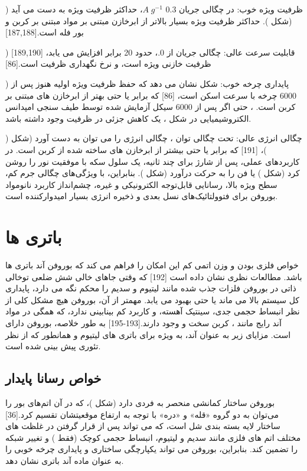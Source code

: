 ) ظرفیت ویژه خوب: در چگالی جریان 0.3 $A\; g^{-1}$، حداکثر ظرفیت ویژه  به دست می آید (شکل ). حداکثر ظرفیت ویژه بسیار بالاتر از ابرخازن مبتنی بر مواد مبتنی بر کربن و بور فله است.[187,188] 

) قابلیت سرعت عالی: چگالی جریان از 0.، حدود 20 برابر افزایش می یابد، [189,190] ظرفیت خازنی ویژه  است، و نرخ نگهداری ظرفیت  است.[86] 

) پایداری چرخه خوب: شکل  نشان می دهد که حفظ ظرفیت ویژه اولیه هنوز  پس از 6000 چرخه با سرعت اسکن  است، [86] که برابر یا حتی بهتر از ابرخازن های مبتنی بر کربن است. ، حتی اگر پس از 6000 سیکل آزمایش شده توسط طیف سنجی امپدانس الکتروشیمیایی در شکل ، یک کاهش جزئی در ظرفیت وجود داشته باشد. 

) چگالی انرژی عالی: تحت چگالی توان ، چگالی انرژی  را می توان به دست آورد (شکل )، [191] که برابر یا حتی بیشتر از ابرخازن های ساخته شده از کربن است. در کاربردهای عملی، پس از شارژ برای چند ثانیه، یک سلول سکه با موفقیت نور را روشن کرد (شکل ) یا فن را به حرکت درآورد (شکل ). بنابراین، با ویژگی‌های چگالی جرم کم، سطح ویژه بالا، رسانایی قابل‌توجه الکترونیکی و غیره، چشم‌انداز کاربرد نانومواد بوروفن برای فتوولتائیک‌های نسل بعدی و ذخیره انرژی بسیار امیدوارکننده است.

\section{باتری ها}
خواص فلزی بودن و وزن اتمی کم این امکان را فراهم می کند که بوروفن آند باتری ها باشد. مطالعات نظری نشان داده است [192] که وقتی جاهای خالی شش ضلعی توخالی ذاتی در بوروفن فلزات جذب شده مانند لیتیوم و سدیم را محکم نگه می دارد، پایداری کل سیستم بالا می ماند یا حتی بهبود می یابد. مهمتر از آن، بوروفن هیچ مشکل کلی از نظر انبساط حجمی جدی، سینتیک آهسته، و کاربرد کم بینابینی ندارد، که همگی در مواد آند رایج مانند ، کربن سخت و  وجود دارند.[193-195] به طور خلاصه، بوروفن دارای است. مزایای زیر به عنوان آند، به ویژه برای باتری های لیتیوم و  همانطور که از نظر تئوری پیش بینی شده است.
\subsection{خواص رسانا پایدار}
بوروفن  ساختار کمانشی منحصر به فردی دارد (شکل )، که در آن اتم‌های بور را می‌توان به دو گروه «قله» و «دره» با توجه به ارتفاع موقعیتشان تقسیم کرد.[36] ساختار لایه بسته بندی شل است، که می تواند پس از قرار گرفتن در غلظت های مختلف اتم های فلزی مانند سدیم و لیتیوم، انبساط حجمی کوچک (فقط ) و تغییر شبکه را تضمین کند. بنابراین، بوروفن می تواند یکپارچگی ساختاری و پایداری چرخه خوبی را به عنوان ماده آند باتری نشان دهد.
